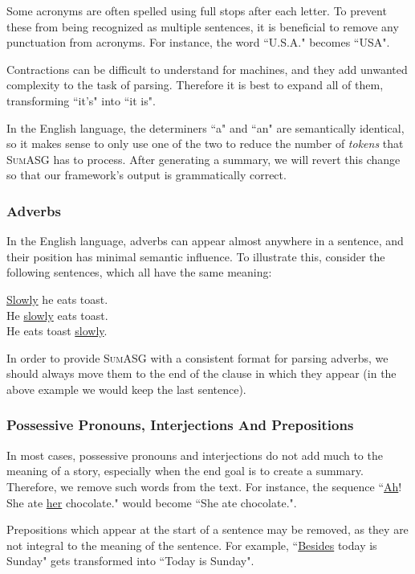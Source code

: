 Some acronyms are often spelled using full stops after each letter. To prevent these from being recognized as multiple sentences, it is beneficial to remove any punctuation from acronyms. For instance, the word ``U.S.A." becomes ``USA".

Contractions can be difficult to understand for machines, and they add unwanted complexity to the task of parsing. Therefore it is best to expand all of them, transforming ``it's" into ``it is".

In the English language, the determiners ``a" and ``an" are semantically identical, so it makes sense to only use one of the two to reduce the number of \textit{tokens} that \textsc{SumASG} has to process. After generating a summary, we will revert this change so that our framework's output is grammatically correct.

\subsubsection*{Adverbs}

In the English language, adverbs can appear almost anywhere in a sentence, and their position has minimal semantic influence. To illustrate this, consider the following sentences, which all have the same meaning:

\begin{displayquote}
\underline{Slowly} he eats toast. \\
He \underline{slowly} eats toast. \\
He eats toast \underline{slowly}.
\end{displayquote}

In order to provide \textsc{SumASG} with a consistent format for parsing adverbs, we should always move them to the end of the clause in which they appear (in the above example we would keep the last sentence).

\subsubsection*{Possessive Pronouns, Interjections And Prepositions}

In most cases, possessive pronouns and interjections do not add much to the meaning of a story, especially when the end goal is to create a summary. Therefore, we remove such words from the text. For instance, the sequence ``\underline{Ah}! She ate \underline{her} chocolate." would become ``She ate chocolate.".

Prepositions which appear at the start of a sentence may be removed, as they are not integral to the meaning of the sentence. For example, ``\underline{Besides} today is Sunday" gets transformed into ``Today is Sunday".


